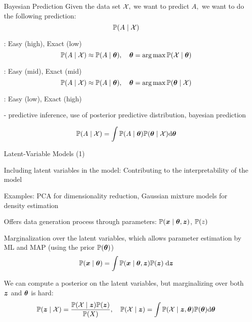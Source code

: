 \documentclass[handout,fleqn,aspectratio=169]{beamer}
\begin{document}
\begin{frame}{Bayesian Prediction}
Given the data set $\mathcal X,$ we want to predict $A,$ we want to do the following prediction: 
$$
\mathbb{P}( A \mid \mathcal X )
$$
\vspace{-1.2cm}
\plitemsep 0.05in
\bci 
\item {}: Easy (high), Exact (low)
$$
\mathbb{P}( A \mid \mathcal X ) \approx \mathbb{P}( A \mid \bm{\theta} ), \quad \bm{\theta} = \arg\max \mathbb{P}( \mathcal X \mid \bm{\theta} )
$$

\item {}: Easy (mid), Exact (mid)
$$
\mathbb{P}( A \mid \mathcal X ) \approx \mathbb{P}( A \mid \bm{\theta} ), \quad \bm{\theta} = \arg\max \mathbb{P}( \bm{\theta} \mid \mathcal X )
$$

\item {}: Easy (low), Exact (high)

\medskip
- predictive inference, use of posterior predictive distribution, bayesian prediction

$$
\mathbb{P}( A \mid \mathcal X ) = \int \mathbb{P}( A \mid \bm{\theta} ) \mathbb{P}( \bm{\theta} \mid \mathcal X )\text{d}\bm{\theta}
$$


\eci
\end{frame}

\begin{frame}{Latent-Variable Models (1)}

\plitemsep 0.05in

\bci 

\item Including latent variables in the model: Contributing to the interpretability of the model

\item Examples: PCA for dimensionality reduction, Gaussian mixture models for density estimation

\item Offers data generation process through parameters: $\mathbb{P}( \bm{x} \mid \bm{\theta}, \bm{z} )$, $\mathbb{P}( z )$

\item Marginalization over the latent variables, which allows parameter estimation by ML and MAP (using the prior $\mathbb{P}( \bm{\theta} )$)
$$
\mathbb{P}( \bm{x} \mid \bm{\theta} ) = \int \mathbb{P}( \bm{x} \mid \bm{\theta}, \bm{z} ) \mathbb{P}( \bm{z} )\; \text{d}\bm{z}
$$

\item We can compute a posterior on the latent variables, but marginalizing over both $\bm{z}$ and $\bm{\theta}$ is hard:
$$
\mathbb{P}( \bm{z} \mid \mathcal X ) = \frac{\mathbb{P}( \mathcal X\mid \bm{z} ) \mathbb{P}( \bm{z} )}{\mathbb{P}( X )}, \quad 
\mathbb{P}( \mathcal X \mid \bm{z} ) = \int \mathbb{P}( \mathcal X \mid \bm{z}, \bm{\theta} ) \mathbb{P}( \bm{\theta} ) \text{d}\bm{\theta}
$$
\eci
\end{frame}
\end{document}
